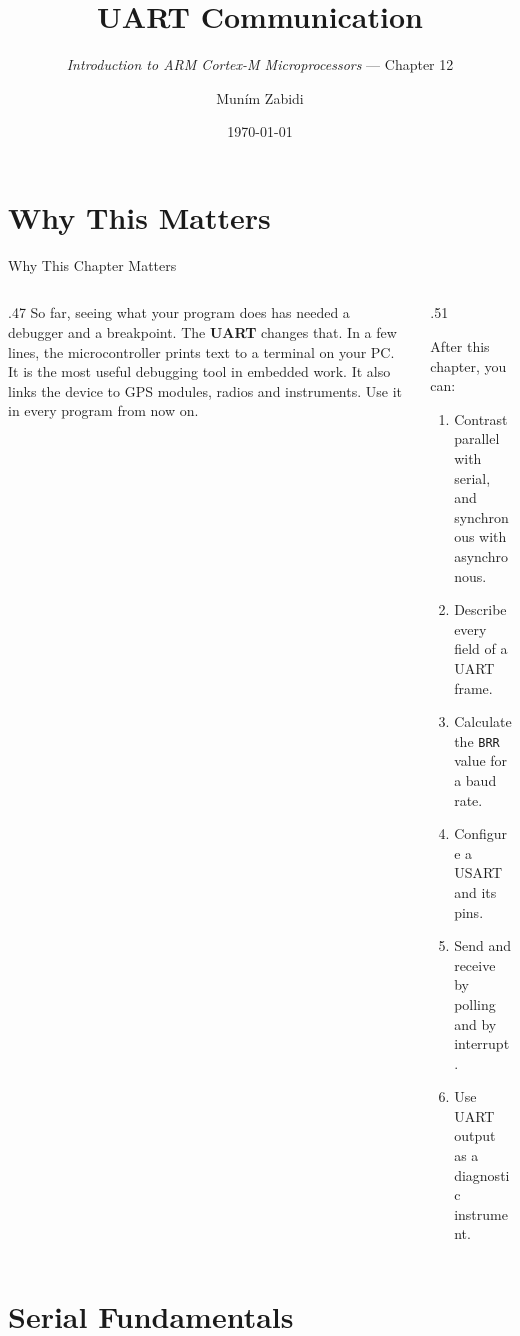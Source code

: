 \documentclass[9pt,aspectratio=169,xcolor=table]{beamer}
\title{UART Communication}
\subtitle{\emph{Introduction to ARM Cortex-M Microprocessors} --- Chapter 12}
\author{Mun\'{i}m Zabidi}
\institute{\color{primary}Faculty of Electrical Engineering, Universiti Teknologi Malaysia}
\date{\today}
\begin{document}
\titlepage

\section{Why This Matters}

\begin{frame}{Why This Chapter Matters}
    \begin{columns}[T]
    \begin{column}{.47\textwidth}
        {\normalsize So far, seeing what your program does has needed a debugger and a breakpoint. The \textbf{UART} changes that. In a few lines, the microcontroller prints text to a terminal on your PC. It is the most useful debugging tool in embedded work. It also links the device to GPS modules, radios and instruments. Use it in every program from now on.}
    \end{column}
    \begin{column}{.51\textwidth}
        \begin{block}{After this chapter, you can:}
        {\small
        \begin{enumerate}\itemsep2pt
            \item Contrast parallel with serial, and synchronous with asynchronous.
            \item Describe every field of a UART frame.
            \item Calculate the \texttt{BRR} value for a baud rate.
            \item Configure a USART and its pins.
            \item Send and receive by polling and by interrupt.
            \item Use UART output as a diagnostic instrument.
        \end{enumerate}}
        \end{block}
    \end{column}
    \end{columns}
\end{frame}


\section{Serial Fundamentals}
\end{document}

